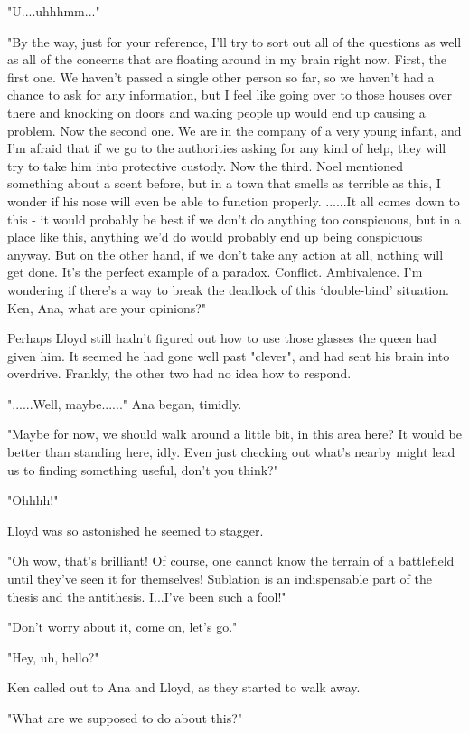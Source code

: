 \documentclass[
]{article}
\begin{document}
"U....uhhhmm..."

"By the way, just for your reference, I'll try to sort out all of the
questions as well as all of the concerns that are floating around in my
brain right now. First, the first one. We haven't passed a single other
person so far, so we haven't had a chance to ask for any information,
but I feel like going over to those houses over there and knocking on
doors and waking people up would end up causing a problem. Now the
second one. We are in the company of a very young infant, and I'm afraid
that if we go to the authorities asking for any kind of help, they will
try to take him into protective custody. Now the third. Noel mentioned
something about a scent before, but in a town that smells as terrible as
this, I wonder if his nose will even be able to function properly.
......It all comes down to this - it would probably be best if we don't
do anything too conspicuous, but in a place like this, anything we'd do
would probably end up being conspicuous anyway. But on the other hand,
if we don't take any action at all, nothing will get done. It's the
perfect example of a paradox. Conflict. Ambivalence. I'm wondering if
there's a way to break the deadlock of this `double-bind' situation.
Ken, Ana, what are your opinions?"

Perhaps Lloyd still hadn't figured out how to use those glasses the
queen had given him. It seemed he had gone well past "clever", and had
sent his brain into overdrive. Frankly, the other two had no idea how to
respond.

"......Well, maybe......" Ana began, timidly.

"Maybe for now, we should walk around a little bit, in this area here?
It would be better than standing here, idly. Even just checking out
what's nearby might lead us to finding something useful, don't you
think?"

"Ohhhh!"

Lloyd was so astonished he seemed to stagger.

"Oh wow, that's brilliant! Of course, one cannot know the terrain of a
battlefield until they've seen it for themselves! Sublation is an
indispensable part of the thesis and the antithesis. I...I've been such
a fool!"

"Don't worry about it, come on, let's go."

"Hey, uh, hello?"

Ken called out to Ana and Lloyd, as they started to walk away.

"What are we supposed to do about this?"
\end{document}
